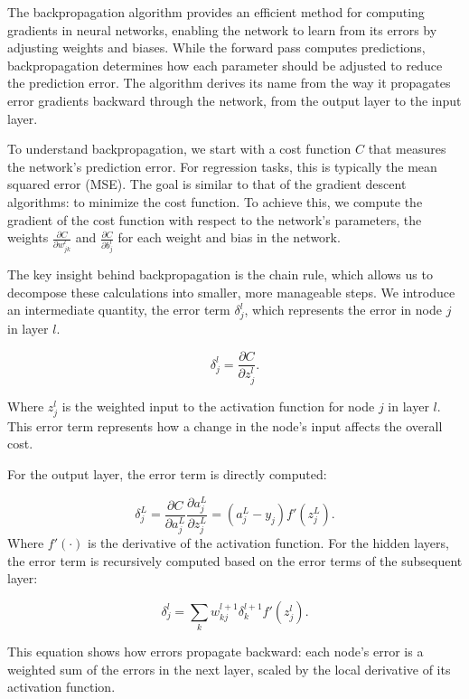 The backpropagation algorithm provides an efficient method for computing gradients in neural networks, enabling the network to learn from its errors by adjusting weights and biases. While the forward pass computes predictions, backpropagation determines how each parameter should be adjusted to reduce the prediction error. The algorithm derives its name from the way it propagates error gradients backward through the network, from the output layer to the input layer.

To understand backpropagation, we start with a cost function \( C \) that measures the network's prediction error. For regression tasks, this is typically the mean squared error (MSE). The goal is similar to that of the gradient descent algorithms: to minimize the cost function. To achieve this, we compute the gradient of the cost function with respect to the network's parameters, the weights \( \frac{\partial C}{\partial w_{jk}^l} \) and \( \frac{\partial C}{\partial b_j^l} \) for each weight and bias in the network.

The key insight behind backpropagation is the chain rule, which allows us to decompose these calculations into smaller, more manageable steps. We introduce an intermediate quantity, the error term \( \delta_j^l \), which represents the error in node \( j \) in layer \( l \).

\begin{equation}
    \delta_j^l = \frac{\partial C}{\partial z_j^l}.
\end{equation}

Where \( z_j^l \) is the weighted input to the activation function for node \( j \) in layer \( l \). This error term represents how a change in the node's input affects the overall cost.

For the output layer, the error term is directly computed:

\begin{equation}
    \delta_j^L = \frac{\partial C}{\partial a_j^L}\frac{\partial a_j^L}{\partial z_j^L} = (a_j^L - y_j)f'(z_j^L).
\end{equation}
Where \( f'(\cdot) \) is the derivative of the activation function. For the hidden layers, the error term is recursively computed based on the error terms of the subsequent layer:

\begin{equation}
    \delta_j^l = \sum_k w_{kj}^{l+1}\delta_k^{l+1}f'(z_j^l).
\end{equation}

This equation shows how errors propagate backward: each node's error is a weighted sum of the errors in the next layer, scaled by the local derivative of its activation function.

